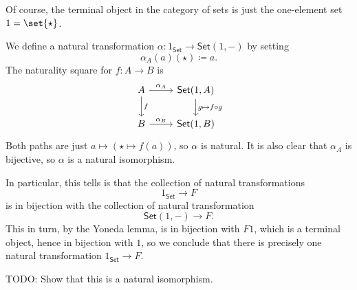 Of course, the terminal object in the category of sets is just the one-element set
$1 = \set{\star}$.

We define a natural transformation $\alpha\colon 1_{\mathsf{Set}}\to \mathsf{Set}(1,{-})$
by setting \[ \alpha_A(a)(\star)\coloneqq a. \]
The naturality square for $f\colon A\to B$ is
\[\begin{tikzcd}
	A\ar[r, "\alpha_A"]\ar[d, "f"] & \mathsf{Set}(1, A)\ar[d, "g\mapsto f \circ g"]\\
	B\ar[r, "\alpha_B"] &\mathsf{Set}(1, B)
\end{tikzcd}\]
Both paths are just $a \mapsto (\star \mapsto f(a))$, so $\alpha$ is natural.
It is also clear that $\alpha_A$ is bijective, so $\alpha$ is a natural isomorphism.

In particular, this tells is that the collection of natural transformations
\[ 1_{\mathsf{Set}} \to F \]
is in bijection with the collection of natural transformation
\[ \mathsf{Set}(1, {-}) \to F. \]
This in turn, by the Yoneda lemma, is in bijection with $F1$, which is a terminal
object, hence in bijection with $1$, so we conclude that there is precisely one
natural transformation $1_{\mathsf{Set}} \to F$.

TODO: Show that this is a natural isomorphism.
